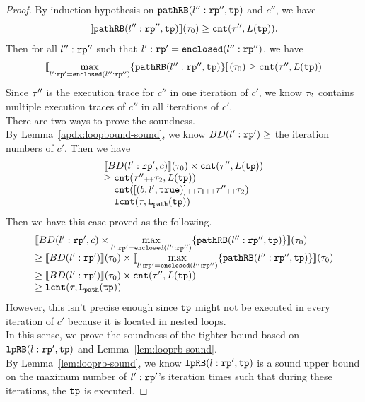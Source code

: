 \begin{proof}
By induction hypothesis on $\mathtt{pathRB}(l'':\mathtt{rp}'', \mathtt{tp})$ and $c''$, we have
\[
  \llbracket \mathtt{pathRB}(l'':\mathtt{rp}'', \mathtt{tp}) \rrbracket(\mathtt{\tau}_0) 
  \geq \mathtt{cnt}(\mathtt{\tau}'', L(\mathtt{tp})).
\]
Then for all $l'':\mathtt{rp}''$ such that $l': \mathtt{rp}' = \mathtt{enclosed}(l'':\mathtt{rp}'')$, we have 
\[
  \begin{array}{l}
  \llbracket \max\limits_{l': \mathtt{rp}' = \mathtt{enclosed}(l'':\mathtt{rp}'')} \{\mathtt{pathRB}(l'':\mathtt{rp}'', \mathtt{tp})\} \rrbracket
  (\mathtt{\tau}_0)
  \geq \mathtt{cnt}(\mathtt{\tau}'', L(\mathtt{tp}))
  \end{array}
\]
Since $\mathtt{\tau}''$ is the execution trace for $c''$ in one iteration of $c'$,
we know $\mathtt{\tau}_2$ contains multiple execution traces of  $c''$ in all iterations of $c'$.
\\
There are two ways to prove the soundness.
\\
By Lemma~\ref{apdx:loopbound-sound}, we know $BD(l':\mathtt{rp}') \geq$ the iteration numbers of $c'$. Then we have
\[
  \begin{array}{l}
  \llbracket  BD(l':\mathtt{rp}', c) \rrbracket(\mathtt{\tau}_0) \times \mathtt{cnt}(\mathtt{\tau}'', L(\mathtt{tp})) \\
  \geq \mathtt{cnt}(\mathtt{\tau}'' {\scriptscriptstyle ++} \mathtt{\tau}_2, L(\mathtt{tp})) \\
  = \mathtt{cnt}([(b, l', \mathtt{true})] {\scriptscriptstyle ++} \mathtt{\tau}_1 {\scriptscriptstyle ++} \mathtt{\tau}'' {\scriptscriptstyle ++} \mathtt{\tau}_2)\\
  = \mathtt{lcnt}(\mathtt{\tau}, \mathtt{L}_{\mathtt{path}}(\mathtt{tp}))
  \end{array}
\]
Then we have this case proved as the following.
\[
  \begin{array}{l}
  \llbracket  BD(l':\mathtt{rp}', c) \times \max\limits_{l': \mathtt{rp}' = \mathtt{enclosed}(l'':\mathtt{rp}'')} \{\mathtt{pathRB}(l'':\mathtt{rp}'', \mathtt{tp})\} \rrbracket(\mathtt{\tau}_0)\\
  \geq \llbracket  BD(l':\mathtt{rp}') \rrbracket(\mathtt{\tau}_0) \times 
  \llbracket \max\limits_{l': \mathtt{rp}' = \mathtt{enclosed}(l'':\mathtt{rp}'')} \{\mathtt{pathRB}(l'':\mathtt{rp}'', \mathtt{tp})\} \rrbracket
  (\mathtt{\tau}_0)\\
  \geq \llbracket  BD(l':\mathtt{rp}') \rrbracket(\mathtt{\tau}_0) \times \mathtt{cnt}(\mathtt{\tau}'', L(\mathtt{tp})) \\
  \geq \mathtt{lcnt}(\mathtt{\tau}, \mathtt{L}_{\mathtt{path}}(\mathtt{tp}))
  \end{array}
\]
However, this isn't precise enough since $\mathtt{tp}$ might not be executed in every iteration of $c'$ because it is located in nested loops. 
\\
In this sense, we prove the soundness of the tighter bound based on $\mathtt{lpRB}(l:\mathtt{rp}', \mathtt{tp})$ and Lemma~\ref{lem:looprb-sound}.
\\
By Lemma~\ref{lem:looprb-sound}, we know $\mathtt{lpRB}(l:\mathtt{rp}', \mathtt{tp})$ is a sound upper bound on the maximum number of $l': \mathtt{rp}'$'s iteration times such that during these iterations, the $\mathtt{tp}$ is executed.

\end{proof}

